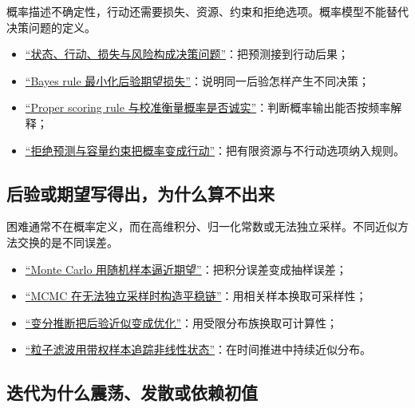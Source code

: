 概率描述不确定性，行动还需要损失、资源、约束和拒绝选项。概率模型不能替代决策问题的定义。

\begin{itemize}
\tightlist
\item \hyperref[sec:11-Mathematical-Statistics/07-Statistical-Decision-and-Reliable-Prediction/01]{``状态、行动、损失与风险构成决策问题''}：把预测接到行动后果；
\item \hyperref[sec:11-Mathematical-Statistics/07-Statistical-Decision-and-Reliable-Prediction/02]{``Bayes rule 最小化后验期望损失''}：说明同一后验怎样产生不同决策；
\item \hyperref[sec:11-Mathematical-Statistics/07-Statistical-Decision-and-Reliable-Prediction/04]{``Proper scoring rule 与校准衡量概率是否诚实''}：判断概率输出能否按频率解释；
\item \hyperref[sec:11-Mathematical-Statistics/07-Statistical-Decision-and-Reliable-Prediction/06]{``拒绝预测与容量约束把概率变成行动''}：把有限资源与不行动选项纳入规则。
\end{itemize}

\subsection{后验或期望写得出，为什么算不出来}

困难通常不在概率定义，而在高维积分、归一化常数或无法独立采样。不同近似方法交换的是不同误差。

\begin{itemize}
\tightlist
\item \hyperref[sec:13-Machine-Learning/08-Sampling-and-Inference/01]{``Monte Carlo 用随机样本逼近期望''}：把积分误差变成抽样误差；
\item \hyperref[sec:13-Machine-Learning/08-Sampling-and-Inference/02]{``MCMC 在无法独立采样时构造平稳链''}：用相关样本换取可采样性；
\item \hyperref[sec:13-Machine-Learning/08-Sampling-and-Inference/03]{``变分推断把后验近似变成优化''}：用受限分布族换取可计算性；
\item \hyperref[sec:13-Machine-Learning/08-Sampling-and-Inference/05]{``粒子滤波用带权样本追踪非线性状态''}：在时间推进中持续近似分布。
\end{itemize}

\subsection{迭代为什么震荡、发散或依赖初值}

